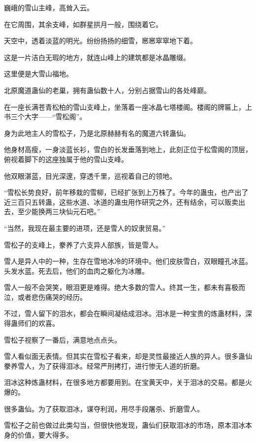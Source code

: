 
\begin{this_body}



巍峨的雪山主峰，高耸入云。

在它周围，其余支峰，如群星拱月一般，围绕着它。

天空中，透着淡蓝的明光。纷纷扬扬的细雪，窸窸窣窣地下着。

这是一片洁白无瑕的地方，就连山峰上的建筑都是冰晶雕缀。

这里便是大雪山福地。

北原魔道蛊仙的老巢，拥有蛊仙数十人，分别占据雪山的各处峰巅。

在一座长满苍青松柏的雪山支峰上，坐落着一座冰晶七塔楼阁。楼阁的牌匾上，上书三个大字——“雪松阁”。

身为此地主人的雪松子，乃是北原赫赫有名的魔道六转蛊仙。

他身材高瘦，一身淡蓝长衫，雪白的长发垂落到地上，此刻正位于松雪阁的顶层，俯视着脚下的这座独属于他的雪山支峰。

他双眼湛蓝，目光深邃，穿透千里，巡视着自己的领地。

“雪松长势良好，前年移栽的雪柳，已经扩张到上万株了。今年的蛊虫，也产出了近三百只五转蛊，这些水道、冰道的蛊虫用作研究之外，还有结余，可以贩卖出去，至少能换两三块仙元石吧。”

“当然，我现在最主要的进项，还是雪人的奴隶贸易。”

雪松子的支峰上，豢养了六支异人部族，皆是雪人。

雪人是异人中的一种，生存在雪地冰冷的环境中。他们皮肤雪白，双眼瞳孔冰蓝。头发水蓝。死去后，他们的血肉之躯化为冰雕。

雪人一般不会哭笑，眼泪更是难得。绝大多数的雪人。终其一生，都未有喜极而泣，或者悲伤痛哭的经历。

不过，雪人留下的泪水，都会在瞬间凝结成泪冰。泪冰是一种宝贵的炼蛊材料，深得蛊师们的欢喜。

雪松子视察了一番后，满意地点点头。

雪人看似面无表情。但其实在雪松子看来，却是灵性最接近人族的异人。很多蛊仙豢养雪人，为了获得泪冰。经常严刑拷打，进行惨无人道的折磨。

泪冰这种炼蛊材料，在很多地方都要用到。在宝黄天中，关于泪冰的交易。都是火爆的。

很多蛊仙。为了获取泪冰，谋夺利润，用尽手段屠杀、折磨雪人。

雪松子之前也做过此类勾当，但很快他发现，蛊仙们获取泪冰的市场，原本泪冰本身的价值，要大得多。


\end{this_body}
